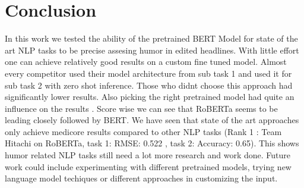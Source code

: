 \documentclass[11pt,a4paper,onecolumn,oneside,notitlepage]{article}
\begin{document}
	\section{Conclusion}
	In this work we tested the ability of the pretrained BERT Model for state of the art NLP tasks to be precise assesing humor in edited headlines. With little effort one can achieve relatively good results on a custom fine tuned model.  Almost every competitor used their model architecture from sub task 1 and used it for sub task 2 with zero shot inference. Those who didnt choose this approach had significantly lower results. Also picking the right pretrained model had quite an influence on the results . Score wise we can see that RoBERTa seems to be leading closely followed by BERT.   We have seen that state of the art approaches  only achieve medicore results compared to other NLP tasks (Rank 1 : Team Hitachi on RoBERTa, task 1: RMSE: 0.522 , task 2: Accuracy: 0.65). This shows humor related NLP tasks still need a lot more research and work done.
	Future work could include experimenting with different pretrained models, trying new language model techiques or different approaches in customizing the input.
	\printbibliography
\end{document}
